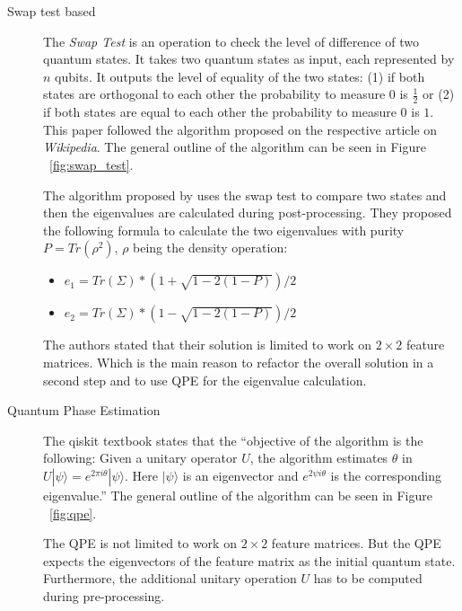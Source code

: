 \begin{description}
\item[Swap test based] The \emph{Swap Test} is an operation to check the level of difference of two quantum states. It takes two quantum states as input, each represented by $n$ qubits. It outputs the level of equality of the two states: (1) if both states are orthogonal to each other the probability to measure $0$ is $\frac{1}{2}$ or (2) if both states are equal to each other the probability to measure $0$ is $1$. This paper followed the algorithm proposed on the respective article on \emph{Wikipedia}. \cite{Wp_Swap} The general outline of the algorithm can be seen in Figure ~\ref{fig:swap_test}.

The algorithm proposed by \cite[pp. 63-66]{Lokho_2020} uses the swap test to compare two states and then the eigenvalues are calculated during post-processing. They proposed the following formula to calculate the two eigenvalues with purity $P = Tr(\rho^2)$, $\rho$ being the density operation:
\begin{itemize}
  \item $e_1 = Tr(\Sigma) \ast (1 + \sqrt{1 - 2 (1 - P)}) / 2$
  \item $e_2 = Tr(\Sigma) \ast (1 - \sqrt{1 - 2 (1 - P)}) / 2$
\end{itemize}

The authors stated that their solution is limited to work on $2 \times 2$ feature matrices. Which is the main reason to refactor the overall solution in a second step and to use QPE for the eigenvalue calculation.

\item[Quantum Phase Estimation] The qiskit textbook states that the \enquote{objective of the algorithm is the following: Given a unitary operator $U$, the algorithm estimates $\theta$ in $U|\psi\rangle = e^{2\pi i\theta}|\psi\rangle$. Here $|\psi\rangle$ is an eigenvector and $e^{2\psi i\theta}$ is the corresponding eigenvalue.}\cite{Qtb_Qpe} The general outline of the algorithm can be seen in Figure ~\ref{fig:qpe}.

The QPE is not limited to work on $2 \times 2$ feature matrices. But the QPE expects the eigenvectors of the feature matrix as the initial quantum state. Furthermore, the additional unitary operation $U$ has to be computed during pre-processing.
\end{description}

